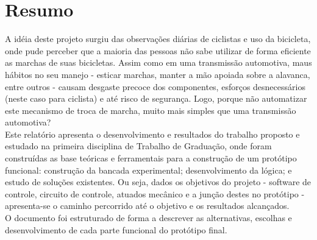 \documentclass[a4paper,11pt]{article}
\begin{document}




%
\section{Resumo}
\label{sec:resumo}
A idéia deste projeto surgiu das observações diárias de ciclistas e uso da bicicleta, onde pude perceber
que a maioria das pessoas não sabe utilizar de forma eficiente as marchas de suas bicicletas. Assim como
em uma transmissão automotiva, maus hábitos no seu manejo - esticar marchas, manter a mão apoiada sobre a 
alavanca, entre outros - causam desgaste precoce dos componentes, esforços desnecessários (neste caso para
ciclista) e até risco de segurança. Logo, porque não automatizar este mecanismo de troca de marcha, muito 
mais simples que uma transmissão automotiva?
\\
Este relatório apresenta o desenvolvimento e resultados do trabalho proposto e estudado na primeira 
disciplina de Trabalho de Graduação, onde foram construídas as base teóricas e ferramentais para a construção 
de um protótipo funcional: construção da bancada experimental; desenvolvimento da lógica; e estudo de soluções 
existentes. Ou seja, dados os objetivos do projeto - software de controle, circuito de controle, atuados mecânico 
e a junção destes no protótipo - apresenta-se o caminho percorrido até o objetivo e os resultados alcançados.
\\
O documento foi estruturado de forma a descrever as alternativas, escolhas e desenvolvimento de cada parte funcional
do protótipo final.
\end{document}
